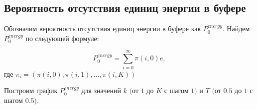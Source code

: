 \documentclass[12pt, a4paper]{article}
\begin{document}
\begin{figure}[h]
\end{figure}


	\subsection{Вероятность отсутствия единиц энергии в буфере}


Обозначим вероятность отсутствия единиц энергии в буфере как $P_0^{energy}$. Найдем $P_0^{energy}$ по следующей формуле:

$$P_0^{energy} = \sum\limits_{i = 0}^{\infty} \pi(i, 0)e,$$ где $\pi_i = (\pi(i, 0), \pi(i, 1), \ldots, \pi(i, K))$

Построим график $P_0^{energy}$ для значений $k$ $($от $1$ до $K$ с шагом $1)$ и  $T$ $($от $0.5$ до $1$  с шагом $0.5)$.
\end{document}
